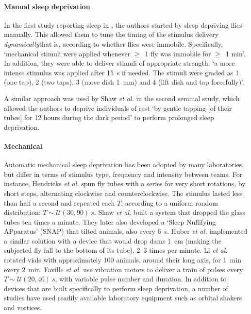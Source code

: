 \paragraph*{Manual sleep deprivation} 
In the first study reporting sleep in \droso{}, the authors started by sleep depriving flies manually\cite{hendricks_rest_2000}.
This allowed them to tune the timing of the stimulus delivery \emph{dynamically}\emd{}that is, according to whether flies were immobile.
Specifically, `mechanical stimuli were applied whenever $\ge$~1 fly was immobile for $\ge$~1 min'.
In addition, they were able to deliver stimuli of appropriate strength:
`a more intense stimulus was applied after 15~s if needed.
The stimuli were graded as 1 (one tap), 2 (two taps), 3 (move dish 1~mm)
and 4 (lift dish and tap forcefully)'.

A similar approach was used by Shaw \emph{et al.} in the second seminal study\cite{shaw_correlates_2000},
which allowed the authors to deprive individuals of rest `by gentle tapping [of their tubes] for 12 hours during the dark period'
to perform prolonged sleep deprivation\cite{shaw_stress_2002}.

\paragraph*{Mechanical}
Automatic mechanical sleep deprivation has been adopted by many laboratories, but differ in terms of
stimulus type, frequency and intensity between teams.
For instance, 
Hendricks \emph{et al.} spun fly tubes with a series for very short rotations, by short steps, 
alternating clockwise and counterclockwise. The stimulus lasted less than half a second and repeated each $T$, according to a uniform random distribution: $T \sim \mathcal{U}(30,90)~s$\cite{hendricks_need_2000}.
Shaw \emph{et al.} built a system that dropped the glass tubes ten times a minute\cite[sup. material]{shaw_correlates_2000}.
They later also developed a `Sleep Nullifying APparatus' (SNAP) that tilted animals, also every 6~s\cite{shaw_stress_2002}.
Huber \emph{et al.} implemented a similar solution with a device that would drop \glspl{dam} 1~cm (making the subjected fly fall to the bottom of its tube),
2--3 times per minute\cite{huber_sleep_2004}.	
Li \emph{et al.} rotated vials with approximately 100 animals, around their long axis, for 1~min every 2~min\cite{li_sleep_2009}.
Faville \emph{et al.} use vibration motors to deliver a train of pulses every $T \sim \mathcal{U}(20,40)~s$, with variable pulse number and duration\cite{faville_how_2015}.
In addition to devices that are built specifically to perform sleep deprivation, a number of studies have used readily available laboratory equipment such as orbital shakers and vortices\cite{kayser_sleep_2015,dubowy_genetic_2016}.

